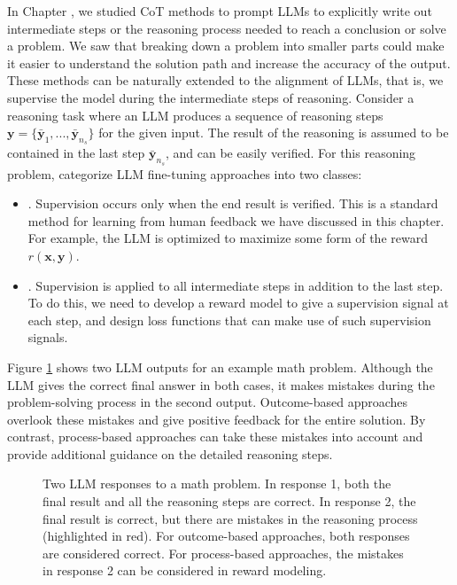 In Chapter \ChapterLLMPrompting, we studied CoT methods to prompt LLMs to explicitly write out intermediate steps or the reasoning process needed to reach a conclusion or solve a problem. We saw that breaking down a problem into smaller parts could make it easier to understand the solution path and increase the accuracy of the output. These methods can be naturally extended to the alignment of LLMs, that is, we supervise the model during the intermediate steps of reasoning. Consider a reasoning task where an LLM produces a sequence of reasoning steps $\mathbf{y} = \{\bar{\mathbf{y}}_1,...,\bar{\mathbf{y}}_{n_s}\}$ for the given input. The result of the reasoning is assumed to be contained in the last step $\bar{\mathbf{y}}_{n_s}$, and can be easily verified. For this reasoning problem, \citet{uesato-etal:2022solving} categorize LLM fine-tuning approaches into two classes:

\begin{itemize}
\item \vspace{0.5em} . Supervision occurs only when the end result is verified. This is a standard method for learning from human feedback we have discussed in this chapter. For example, the LLM is optimized to maximize some form of the reward $r(\mathbf{x},\mathbf{y})$.
\item \vspace{0.3em} . Supervision is applied to all intermediate steps in addition to the last step. To do this, we need to develop a reward model to give a supervision signal at each step, and design loss functions that can make use of such supervision signals.
\end{itemize}
\vspace{0.5em}

Figure \ref{fig:outcome-vs-process-based-approaches} shows two LLM outputs for an example math problem. Although the LLM gives the correct final answer in both cases, it makes mistakes during the problem-solving process in the second output. Outcome-based approaches overlook these mistakes and give positive feedback for the entire solution. By contrast, process-based approaches can take these mistakes into account and provide additional guidance on the detailed reasoning steps.

\begin{figure}[!t]
\centering

\caption{Two LLM responses to a math problem. In response 1, both the final result and all the reasoning steps are correct. In response 2, the final result is correct, but there are mistakes in the reasoning process (highlighted in red). For outcome-based approaches, both responses are considered correct. For process-based approaches, the mistakes in response 2 can be considered in reward modeling.}
\label{fig:outcome-vs-process-based-approaches}
\end{figure}

